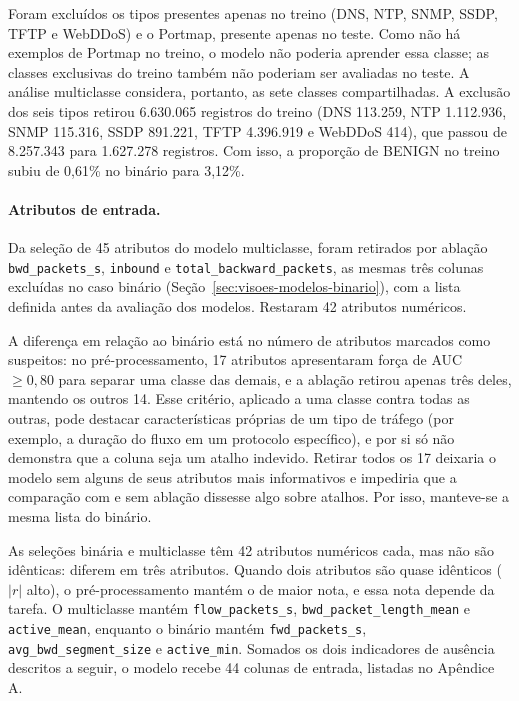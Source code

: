 \documentclass[
    12pt,                %
    openright,           %
    oneside,             %
    a4paper,             %
    english,             %
    brazil               %
]{abntex2}
\begin{document}
Foram excluídos os tipos presentes apenas no treino (DNS, NTP, SNMP, SSDP, TFTP e WebDDoS) e o Portmap, presente apenas no teste. Como não há exemplos de Portmap no treino, o modelo não poderia aprender essa classe; as classes exclusivas do treino também não poderiam ser avaliadas no teste. A análise multiclasse considera, portanto, as sete classes compartilhadas. A exclusão dos seis tipos retirou 6.630.065 registros do treino (DNS 113.259, NTP 1.112.936, SNMP 115.316, SSDP 891.221, TFTP 4.396.919 e WebDDoS 414), que passou de 8.257.343 para 1.627.278 registros. Com isso, a proporção de BENIGN no treino subiu de 0,61\% no binário para 3,12\%.

\paragraph{Atributos de entrada.}
Da seleção de 45 atributos do modelo multiclasse, foram retirados por ablação \texttt{bwd\_packets\_s}, \texttt{inbound} e \texttt{total\_backward\_packets}, as mesmas três colunas excluídas no caso binário (Seção~\ref{sec:visoes-modelos-binario}), com a lista definida antes da avaliação dos modelos. Restaram 42 atributos numéricos.

A diferença em relação ao binário está no número de atributos marcados como suspeitos: no pré-processamento, 17 atributos apresentaram força de AUC $\geq 0{,}80$ para separar uma classe das demais, e a ablação retirou apenas três deles, mantendo os outros 14. Esse critério, aplicado a uma classe contra todas as outras, pode destacar características próprias de um tipo de tráfego (por exemplo, a duração do fluxo em um protocolo específico), e por si só não demonstra que a coluna seja um atalho indevido. Retirar todos os 17 deixaria o modelo sem alguns de seus atributos mais informativos e impediria que a comparação com e sem ablação dissesse algo sobre atalhos. Por isso, manteve-se a mesma lista do binário.

As seleções binária e multiclasse têm 42 atributos numéricos cada, mas não são idênticas: diferem em três atributos. Quando dois atributos são quase idênticos ($|r|$ alto), o pré-processamento mantém o de maior nota, e essa nota depende da tarefa. O multiclasse mantém \texttt{flow\_packets\_s}, \texttt{bwd\_packet\_length\_mean} e \texttt{active\_mean}, enquanto o binário mantém \texttt{fwd\_packets\_s}, \texttt{avg\_bwd\_segment\_size} e \texttt{active\_min}. Somados os dois indicadores de ausência descritos a seguir, o modelo recebe 44 colunas de entrada, listadas no Apêndice A.
\end{document}
